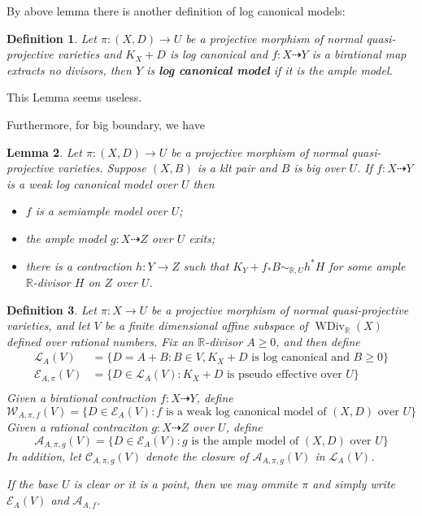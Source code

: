 \documentclass[11pt]{amsart}
\numberwithin{equation}{section}
\newtheorem{defn}{Definition}[subsection]
\newtheorem{lem}[defn]{Lemma}
\begin{document}
By above lemma there is another definition of log canonical models:
\begin{defn}
  Let $ \pi:(X,D)\to U $ be a projective morphism of normal quasi-projective varieties and $ K_X+D $ is log canonical and $ f:X\dashrightarrow Y $ is a birational map extracts no divisors, then $ Y $ is \textbf{ log canonical model} if it is the ample model. 
\end{defn}
This Lemma seems useless.

Furthermore, for big boundary, we have
\begin{lem}\cite[Lemma 3.9.3]{birkarExistenceMinimalModels2009}Let $ \pi:(X,D)\to U $ be a projective morphism of normal quasi-projective varieties. Suppose $(X,B)$ is a klt pair and  $B$ is big over $U$. If $f:X\dashrightarrow Y$ is a weak log canonical model over $U$ then
  \begin{itemize}
    \item $f$ is a semiample model over $U$;
    \item  the ample model $g:X \dashrightarrow Z$ over $U$ exits;
    \item  there is a contraction $h:Y\to Z$ such that $K_{Y}+f_*B\sim_{\mathbb{R},U} h^*H$ for some ample $\mathbb{R}$-divisor $H$ on $Z$ over $U$.   
  \end{itemize}
\end{lem}
\begin{defn}\label{polytopeofdivisor}
  \cite[Definition 1.1.4]{birkarExistenceMinimalModels2009} Let $ \pi:X\to U $ be a projective morphism of normal quasi-projective varieties, and  let $ V $ be a finite dimensional affine subspace of $ \operatorname{WDiv}_{\mathbb{R}}(X) $ defined over rational numbers. Fix an $ \mathbb{R} $-divisor $ A\geqslant 0 $, and then define
  \[
    \begin{aligned}
      \mathcal{L}_A(V)&=\{D=A+B:B \in V,  K_X+D \text{ is log canonical and  } B\geqslant0 \}\\
      \mathcal{E}_{A,\pi}(V)&=\{D\in \mathcal{L}_A(V): K_X+D \text{ is pseudo effective over } U\}\\ 
    \end{aligned}
  \]
  Given a birational contraction $ f:X \dashrightarrow Y $, define
  \[ \mathcal{W}_{A,\pi,f}(V)=\{D\in \mathcal{E}_{A}(V): f \text{ is a weak log canonical model of  } (X,D) \text{ over }U\} \]
  Given a rational contraciton $g:X\dashrightarrow Z  $ over $ U $, define
  \[ \mathcal{A}_{A,\pi,g}(V)=\{D\in \mathcal{E}_{A}(V): g \text{ is the ample model of  } (X,D) \text{ over }U\} \]
  In addition, let $ \mathcal{C}_{A,\pi,g}(V) $ denote the closure of $ \mathcal{A}_{A,\pi,g}(V) $ in $\mathcal{L}_{A}(V)$.

  If the base $U$ is clear or it is a point, then we may ommite $\pi$ and simply write $\mathcal{E}_{A}(V)$ and $\mathcal{A}_{A,f}$.
\end{defn}
\end{document}
